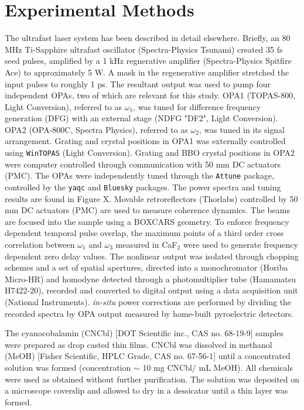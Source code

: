 \documentclass[aip, jcp, reprint, onecolumn]{revtex4-2}
\begin{document}
\section{Experimental Methods}
The ultrafast laser system has been described in detail elsewhere. \cite{RN278, Kaufman2024}
Briefly, an 80 MHz Ti-Sapphire ultrafast oscillator (Spectra-Physics Tsunami) created 35 fs seed pulses, amplified by a 1 kHz regnerative amplifier (Spectra-Physics Spitfire Ace) to approximately 5 W.
A mask in the regenerative amplifier stretched the input pulses to roughly 1 ps.
The resultant output was used to pump four independent OPAs, two of which are relevant for this study.
OPA1 (TOPAS-800, Light Conversion), referred to as $\omega_1$, was tuned for difference frequency generation (DFG) with an external stage (NDFG "DF2", Light Conversion).
OPA2 (OPA-800C, Spectra Physics), referred to as $\omega_2$, was tuned in its signal arrangement. 
Grating and crystal positions in OPA1 was externally controlled using \texttt{WinTOPAS} (Light Conversion).
Grating and BBO crystal positions in OPA2 were computer controlled through communication with 50 mm DC actuators (PMC). %
The OPAs were independently tuned through the \texttt{Attune} package, controlled by the \texttt{yaqc} and \texttt{Bluesky} packages. \cite{RN414, RN386, SkyeOPA, KyleOPA}
The power spectra and tuning results are found in Figure X.
Movable retroreflectors (Thorlabs) controlled by 50 mm DC actuators (PMC) are used to measure coherence dynamics.
The beams are focused into the sample using a BOXCARS geometry.\cite{RN308, Kaufman2024}
To enforce frequency dependent temporal pulse overlap, the maximum points of a third order cross correlation between $\omega_1$ and $\omega_3$ measured in CaF$_2$ were used to generate frequency dependent zero delay values.
The nonlinear output was isolated through chopping schemes and a set of spatial apertures, directed into a monochromator (Horiba Micro-HR) and homodyne detected through a photomultiplier tube (Hamamatsu H7422-20), recorded and converted to digital output using a data acquisition unit (National Instruments).
\textit{in-situ} power corrections are performed by dividing the recorded spectra by OPA output measured by home-built pyroelectric detectors.

The cyanocobalamin (CNCbl) [DOT Scientific inc., CAS no. 68-19-9] samples were prepared as drop casted thin films.
CNCbl was dissolved in methanol (MeOH) [Fisher Scientific, HPLC Grade, CAS no. 67-56-1] until a concentrated solution was formed (concentration $\sim$ 10 mg CNCbl/ mL MeOH). 
All chemicals were used as obtained without further purification.
The solution was deposited on a microscope coverslip and allowed to dry in a dessicator until a thin layer was formed.
\end{document}
